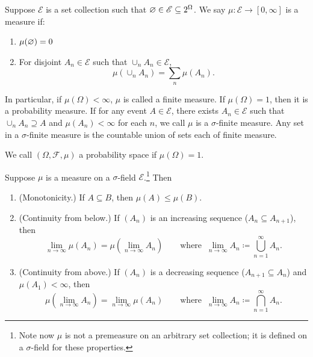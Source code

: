\begin{definition}[Measure]
	Suppose $\mathscr{E}$ is a set collection such that $\varnothing \in \mathscr{E} \subseteq  2^{\Omega}$. We say $\mu: \mathscr{E}\to [0,\infty]$ is a measure if:
	\begin{enumerate}[label=(\roman*)]
		\item $\mu(\varnothing) = 0$ 
		\item For disjoint $A_n \in \mathscr{E}$ such that $\cup_n A_n \in \mathscr{E}$, \[
			\mu(\cup_n A_n) = \sum_n \mu(A_n)
		.\] 
	\end{enumerate}
	In particular, if $\mu(\Omega) < \infty$, $\mu$ is called a finite measure. If $\mu(\Omega) = 1$, then it is a probability measure. If for any event $A \in \mathscr{E}$, there exists $A_n \in \mathscr{E}$ such that $\cup_n A_n \supseteq A$ and $\mu(A_n) < \infty$ for each $n$, we call $\mu$ is a $\sigma$-finite measure. Any set in a $\sigma$-finite measure is the countable union of sets each of finite measure.
\end{definition}

\begin{definition}
	We call $(\Omega, \mathscr{F}, \mu)$ a probability space if $\mu(\Omega) = 1$.
\end{definition}

\begin{remark}
	Suppose $\mu$ is a measure on a $\sigma$-field $\mathscr{E}$.\footnote{Note now $\mu$ is not a premeasure on an arbitrary set collection; it is defined on a $\sigma$-field for these properties.} Then
	\begin{enumerate}[label=(\roman*)]
		\item (Monotonicity.) If $A \subseteq B$, then $\mu(A) \le \mu(B)$.
		\item (Continuity from below.) If $(A_n)$ is an increasing sequence ($A_n \subseteq A_{n+1}$), then
		\[
			\lim_{n \to \infty} \mu(A_n) = \mu\!\left( \lim_{n \to \infty} A_n \right)
			\qquad\text{where }\ \lim_{n\to\infty}A_n\coloneqq\bigcup_{n=1}^\infty A_n .
		\]
		\item (Continuity from above.) If $(A_n)$ is a decreasing sequence ($A_{n+1} \subseteq A_n$) and $\mu(A_1) < \infty$, then
		\[
			\mu\!\left( \lim_{n \to \infty} A_n \right)= \lim_{n \to \infty} \mu(A_n)
			\qquad\text{where }\ \lim_{n\to\infty}A_n\coloneqq\bigcap_{n=1}^\infty A_n .
		\]
	\end{enumerate}
\end{remark}


